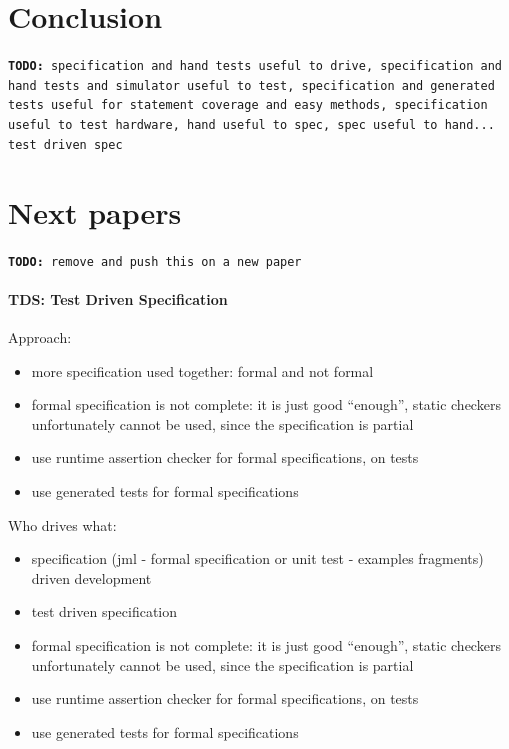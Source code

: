 \documentclass{article} \usepackage{times}
\newcommand{\todo}[1]{\texttt{\textbf{TODO:} #1}}
\begin{document}
\section{Conclusion}
\label{sec:conclusion}


\todo{specification and hand tests useful to drive, specification and
  hand tests and simulator useful to test, specification and generated
  tests useful for statement coverage and easy methods, specification
  useful to test hardware, hand useful to spec, spec useful to
  hand... test driven spec}


\section{Next papers}

\todo{remove and push this on a new paper}

\paragraph*{TDS: Test Driven Specification}

Approach:
\begin{itemize}
\item more specification used together: formal and not formal
\item formal specification is not complete: it is just good
  ``enough'', static checkers unfortunately cannot be used, since the
  specification is partial
\item use runtime assertion checker for formal specifications, on
  tests
\item use generated tests for formal specifications
\end{itemize}

Who drives what:
\begin{itemize}
\item specification (jml - formal specification or unit test -
  examples fragments) driven development
\item test driven specification
\item formal specification is not complete: it is just good
  ``enough'', static checkers unfortunately cannot be used, since the
  specification is partial
\item use runtime assertion checker for formal specifications, on
  tests
\item use generated tests for formal specifications
\end{itemize}
\end{document}
